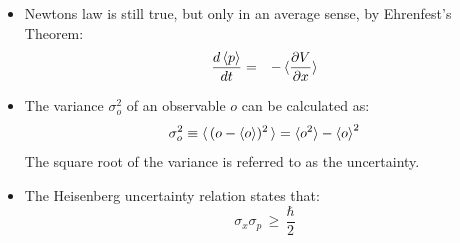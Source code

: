 \documentclass[12pt]{book}
\begin{document}
\begin{itemize}
\item Newtons law is still true, but only in an average sense, by Ehrenfest's Theorem:
\begin{eqnarray}
\frac{d \braket{p}}{dt} &=& - \braket{\frac{\partial V}{\partial x}}
\end{eqnarray}
\item The variance $\sigma^2_o$ of an observable $o$ can be calculated as:
\begin{equation}
\sigma_o^2 \equiv \braket{\,(o-\braket{o})^2\,} = \braket{o^2}-\braket{o}^2
\end{equation}
The square root of the variance is referred to as the uncertainty.  
\item The Heisenberg uncertainty relation states that:
\begin{equation}
\sigma_x \sigma_p \, \geq \, \frac{\hbar}{2}
\end{equation}

\end{itemize}
\end{document}
